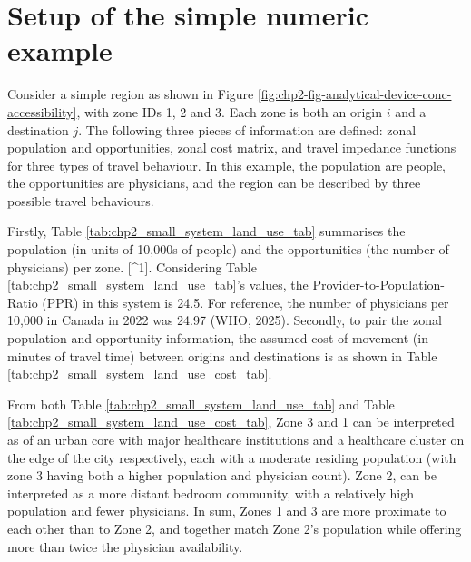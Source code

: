 \documentclass[
11pt, %
oneside, %
english, %
singlespacing, %
]{macthesis} %
\begin{document}
\section{Setup of the simple numeric example}\label{setup-of-the-simple-numeric-example}

Consider a simple region as shown in Figure \ref{fig:chp2-fig-analytical-device-conc-accessibility}, with zone IDs 1, 2 and 3. Each zone is both an origin \(i\) and a destination \(j\). The following three pieces of information are defined: zonal population and opportunities, zonal cost matrix, and travel impedance functions for three types of travel behaviour. In this example, the population are people, the opportunities are physicians, and the region can be described by three possible travel behaviours.





Firstly, Table \ref{tab:chp2_small_system_land_use_tab} summarises the population (in units of 10,000s of people) and the opportunities (the number of physicians) per zone. {[}\^{}1{]}. Considering Table \ref{tab:chp2_small_system_land_use_tab}'s values, the Provider-to-Population-Ratio (PPR) in this system is 24.5. For reference, the number of physicians per 10,000 in Canada in 2022 was 24.97 (WHO, 2025). Secondly, to pair the zonal population and opportunity information, the assumed cost of movement (in minutes of travel time) between origins and destinations is as shown in Table \ref {tab:chp2_small_system_land_use_cost_tab}.

From both Table \ref{tab:chp2_small_system_land_use_tab} and Table \ref {tab:chp2_small_system_land_use_cost_tab}, Zone 3 and 1 can be interpreted as of an urban core with major healthcare institutions and a healthcare cluster on the edge of the city respectively, each with a moderate residing population (with zone 3 having both a higher population and physician count). Zone 2, can be interpreted as a more distant bedroom community, with a relatively high population and fewer physicians. In sum, Zones 1 and 3 are more proximate to each other than to Zone 2, and together match Zone 2's population while offering more than twice the physician availability.
\end{document}
